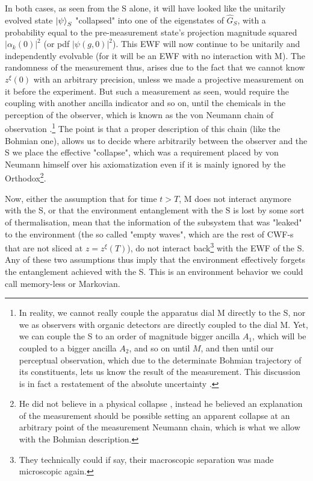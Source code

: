 \documentclass[11pt, a4paper]{article} %
\begin{document}
\newpage
In both cases, as seen from the S alone, it will have looked like the unitarily evolved state $\ket{\psi}_S$ "collapsed" into one of the eigenstates of $\hat{G}_S$, with a probability equal to the pre-measurement state's projection magnitude squared $|\alpha_k(0)|^2$ (or pdf $|\psi(g,0)|^2$). This EWF will now continue to be unitarily and independently evolvable (for it will be an EWF with no interaction with M). The randomness of the measurement thus, arises due to the fact that we cannot know $z^\xi(0)$ with an arbitrary precision, unless we made a projective measurement on it before the experiment. But such a measurement as seen, would require the coupling with another ancilla indicator and so on, until the chemicals in the perception of the observer, which is known as the von Neumann chain of observation \cite{vonNeumann}.\footnote{In reality, we cannot really couple the apparatus dial M directly to the S, nor we as observers with organic detectors are directly coupled to the dial M. Yet, we can couple the S to an order of magnitude bigger ancilla $A_1$, which will be coupled to a bigger ancilla $A_2$, and so on until $M$, and then until our perceptual observation, which due to the determinate Bohmian trajectory of its constituents, lets us know the result of the measurement. This discussion is in fact a restatement of the absolute uncertainty \cite{Absolute}.} The point is that a proper description of this chain (like the Bohmian one), allows us to decide where arbitrarily between the observer and the S we place the effective "collapse", which was a requirement placed by von Neumann himself \cite{vonNeumann, NeumannNoCollapse} over his axiomatization even if it is mainly ignored by the Orthodox\footnote{He did not believe in a physical collapse \cite{NeumannNoCollapse}, instead he believed an explanation of the measurement should be possible setting an apparent collapse at an arbitrary point of the measurement Neumann chain, which is what we allow with the Bohmian description.}.

Now, either the assumption that for time $t>T$, M does not interact anymore with the S, or that the environment entanglement with the S is lost by some sort of thermalisation, mean that the information of the subsystem that was "leaked" to the environment (the so called "empty waves", which are the rest of CWF-s that are not sliced at $z=z^\xi(T)$), do not interact back\footnote{ They technically could if say, their macroscopic separation was made microscopic again. } with the EWF of the S. Any of these two assumptions thus imply that the environment effectively forgets the entanglement achieved with the S. This is an environment behavior we could call memory-less or Markovian.
\end{document}
